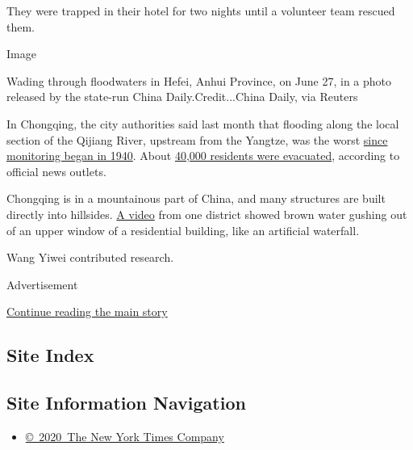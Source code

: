 They were trapped in their hotel for two nights until a volunteer team
rescued them.

Image

Wading through floodwaters in Hefei, Anhui Province, on June 27, in a
photo released by the state-run China Daily.Credit...China Daily, via
Reuters

In Chongqing, the city authorities said last month that flooding along
the local section of the Qijiang River, upstream from the Yangtze, was
the worst
\href{https://www.chinadaily.com.cn/a/202006/22/WS5ef09caca310834817254b2c.html}{since
monitoring began in 1940}. About
\href{https://mp.weixin.qq.com/s/dYW1K1N6nqmvzLmCAeQiLQ}{40,000
residents were evacuated}, according to official news outlets.

Chongqing is in a mountainous part of China, and many structures are
built directly into hillsides.
\href{https://mp.weixin.qq.com/s?__biz=MzU4NzExNTgwOQ==\&mid=2247500615\&idx=5\&sn=098259bb066399950b6e7c11dc4950f8\&chksm=fdf27f09ca85f61f6ee1bd541a1376d75d14f048ad610422307a289006682225c7be6ffaadbc\#rd}{A
video} from one district showed brown water gushing out of an upper
window of a residential building, like an artificial waterfall.

Wang Yiwei contributed research.

Advertisement

\protect\hyperlink{after-bottom}{Continue reading the main story}

\hypertarget{site-index}{%
\subsection{Site Index}\label{site-index}}

\hypertarget{site-information-navigation}{%
\subsection{Site Information
Navigation}\label{site-information-navigation}}

\begin{itemize}
\tightlist
\item
  \href{https://help.nytimes.com/hc/en-us/articles/115014792127-Copyright-notice}{©~2020~The
  New York Times Company}
\end{itemize}

